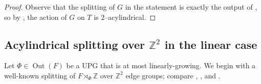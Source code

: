 \documentclass[11pt,oneside]{amsart}
\theoremstyle{definition}
\DeclareMathOperator{\Out}{Out}
\newcommand{\field}[1]{\mathbb{#1}}
\newcommand{\integers}{\ensuremath{\field{Z}}}
\begin{document}
\begin{proof}
Observe that the splitting of $G$ in the statement is exactly the output of \cite[Prop. 2.5]{AndrewHughesKudlinska}, so by \cite[Lem. 5.2]{KudlinskaValiunas}, the action of $G$ on $T$ is $2$--acylindrical.
\end{proof}



\subsection{Acylindrical splitting over $\integers^2$ in the linear case}\label{subsec:acylindrical-splitting-linear}
Let  $\Phi\in \Out(F)$ be a UPG that is at most linearly-growing.  We begin with a well-known splitting of $F\rtimes_\Phi\integers$ over $\integers^2$ edge groups; compare \cite[Prop. 5.2.2]{AndrewMartino:splitting}, \cite[Thm. 2.7]{DahmaniTouikan}, and \cite[Lem. 4.4]{AndrewHughesKudlinska}.
\end{document}
